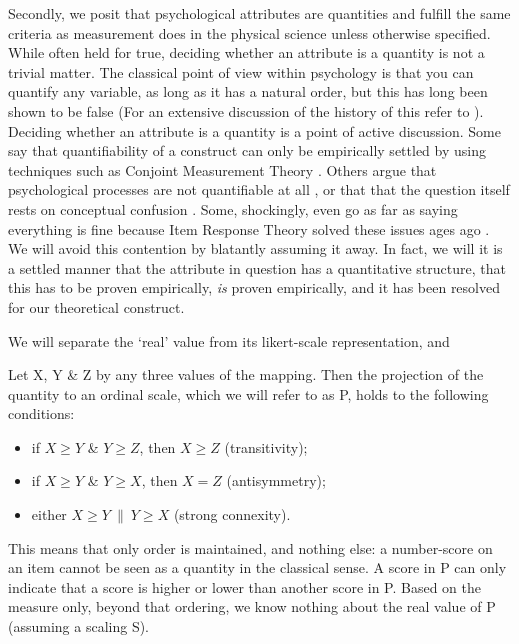 \documentclass[utf8]{FrontiersinVancouver}
\begin{document}
Secondly, we posit that psychological attributes are quantities and fulfill the same criteria as measurement does in the physical science unless otherwise specified. While often held for true, deciding whether an attribute is a quantity is not a trivial matter. The classical point of view within psychology is that you can quantify any variable, as long as it has a natural order, but this has long been shown to be false \cite{krantzMeasurementStructuresPsychological1972} (For an extensive discussion of the history of this refer to \citep{michellMeasurementPsychologyCritical1999}). Deciding whether an attribute is a quantity is a point of active discussion. Some say that quantifiability of a construct can only be empirically settled by using techniques such as Conjoint Measurement Theory \citep{luceSimultaneousConjointMeasurement1964}. Others argue that psychological processes are not quantifiable at all \citep{trendlerConjointMeasurementUndone2019}, or that that the question itself rests on conceptual confusion \citep{franzArePsychologicalAttributes2022,tafreshiSenseNonsensePsychological2022}. Some, shockingly, even go as far as saying everything is fine because Item Response Theory solved these issues ages ago \citep{borsboomWhyPsychometricsNot2004}. We will avoid this contention by blatantly assuming it away. In fact, we will it is a settled manner that the attribute in question has a quantitative structure, that this has to be proven empirically, \textit{is} proven empirically, and it has been resolved for our theoretical construct.

We will separate the `real' value from its likert-scale representation, and  

Let X, Y \& Z by any three values of the mapping. Then the projection of the quantity to an ordinal scale, which we will refer to as P, holds to the following conditions:
\begin{itemize}
    \item if $X \geq Y$ \& $Y \geq Z$, then $X \geq Z$ (transitivity);
    \item if $X \geq Y$ \& $Y \geq X$, then $X = Z$ (antisymmetry);
    \item either $X \geq Y\ \|\ Y \geq X$ (strong connexity).
\end{itemize}

This means that only order is maintained, and nothing else: a number-score on an item cannot be seen as a quantity in the classical sense. A score in P can only indicate that a score is higher or lower than another score in P. Based on the measure only, beyond that ordering, we know nothing about the real value of P (assuming a scaling S).
\end{document}
